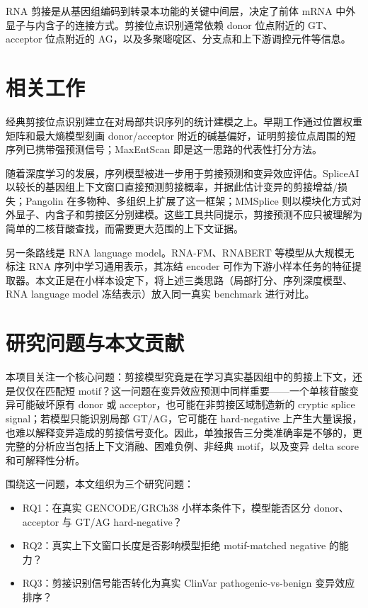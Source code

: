 \documentclass[
    oneside,
    fontset = win,
  ]{njuthesis}
\begin{document}
RNA 剪接是从基因组编码到转录本功能的关键中间层，决定了前体 mRNA 中外显子与内含子的连接方式。剪接位点识别通常依赖 donor 位点附近的 GT、acceptor 位点附近的 AG，以及多聚嘧啶区、分支点和上下游调控元件等信息。

\section{相关工作}

经典剪接位点识别建立在对局部共识序列的统计建模之上。早期工作通过位置权重矩阵和最大熵模型刻画 donor/acceptor 附近的碱基偏好，证明剪接位点周围的短序列已携带强预测信号\cite{black2003,yeo2004}；MaxEntScan 即是这一思路的代表性打分方法。

随着深度学习的发展，序列模型被进一步用于剪接预测和变异效应评估。SpliceAI 以较长的基因组上下文窗口直接预测剪接概率，并据此估计变异的剪接增益/损失\cite{jaganathan2019}；Pangolin 在多物种、多组织上扩展了这一框架\cite{zeng2022pangolin}；MMSplice 则以模块化方式对外显子、内含子和剪接区分别建模\cite{cheng2019}。这些工具共同提示，剪接预测不应只被理解为简单的二核苷酸查找，而需要更大范围的上下文证据。

另一条路线是 RNA language model。RNA-FM、RNABERT 等模型从大规模无标注 RNA 序列中学习通用表示\cite{chen2022rnafm,akiyama2022rnabert}，其冻结 encoder 可作为下游小样本任务的特征提取器。本文正是在小样本设定下，将上述三类思路（局部打分、序列深度模型、RNA language model 冻结表示）放入同一真实 benchmark 进行对比。

\section{研究问题与本文贡献}

本项目关注一个核心问题：剪接模型究竟是在学习真实基因组中的剪接上下文，还是仅仅在匹配短 motif？这一问题在变异效应预测中同样重要——一个单核苷酸变异可能破坏原有 donor 或 acceptor，也可能在非剪接区域制造新的 cryptic splice signal；若模型只能识别局部 GT/AG，它可能在 hard-negative 上产生大量误报，也难以解释变异造成的剪接信号变化。因此，单独报告三分类准确率是不够的，更完整的分析应当包括上下文消融、困难负例、非经典 motif，以及变异 delta score 和可解释性分析。

围绕这一问题，本文组织为三个研究问题：

\begin{itemize}
  \item RQ1：在真实 GENCODE/GRCh38 小样本条件下，模型能否区分 donor、acceptor 与 GT/AG hard-negative？
  \item RQ2：真实上下文窗口长度是否影响模型拒绝 motif-matched negative 的能力？
  \item RQ3：剪接识别信号能否转化为真实 ClinVar pathogenic-vs-benign 变异效应排序？
\end{itemize}
\end{document}
